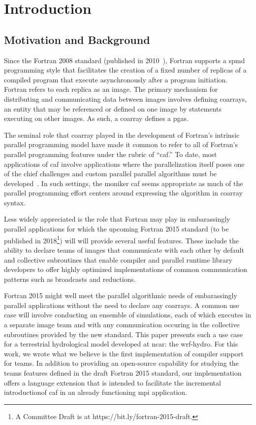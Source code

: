 \section{Introduction}
\subsection{Motivation and Background}
Since the Fortran 2008 standard (published in 2010~\cite{iso2010fortran}), Fortran supports a \gls{spmd} programming style
that facilitates the creation of a fixed number of replicas of a compiled program that execute asynchronously after a program
initiation.  Fortran refers to each replica as an image.  The primary mechanism for distributing and communicating data between
images involves defining \glspl{coarray}, an entity that may be referenced or defined on one image by statements executing on
other images. As such, a coarray defines a \gls{pgas}.

The seminal role that \gls{coarray} played in the development of Fortran's intrinsic parallel programming model have made it
common to refer to all of Fortran's parallel programming features under the rubric of ``\gls{caf}.''  To date, most applications
of \gls{caf} involve applications where the parallelization itself poses one of the chief challenges and custom parallel
parallel algorithms must be developed~\cite{preissl2011multithreaded,garain2015comparing,mozdzynski2015partitioned}.  In such settings, the moniker \gls{caf} seems appropriate as much of the parallel programming effort centers around expressing the algorithm in \gls{coarray} syntax.

Less widely appreciated is the role that Fortran may play in embarassingly parallel applications for which the upcoming
Fortran 2015 standard (to be published in 2018\footnote{A Committee Draft is at https://bit.ly/fortran-2015-draft.}) will
will provide several useful features.  These include the ability to declare teams of images that communicate with each other
by default and collective subroutines that enable compiler and parallel runtime library developers to offer highly optimized
implementations of common communication patterns such as broadcasts and reductions.

Fortran 2015 might well meet the parallel algorithmic needs of embarassingly parallel applications without the need to declare
any \glspl{coarray}.  A common use case will involve conducting an ensemble of simulations, each of which executes in a separate
image team and with any communication occuring in the collective subroutines provided by the new standard.  This paper presents
such a use case for a terrestrial hydrological model developed at \gls{ncar}: the \gls{wrf-hydro}.  For this work, we wrote
what we believe is the first implementation of compiler support for teams.  In addition to providing an open-source capability
for studying the teams features defined in the draft Fortran 2015 standard, our implementation offers a language extension
that is intended to facilitate the incremental introductionof \gls{caf} in an already functioning \gls{mpi} application.

